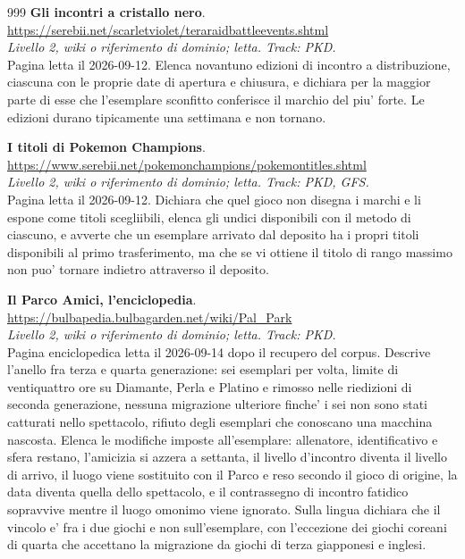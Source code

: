 \begin{thebibliography}{999}
  \textbf{Gli incontri a cristallo nero}.
  \\ \url{https://serebii.net/scarletviolet/teraraidbattleevents.shtml}
  \\ \emph{Livello 2, wiki o riferimento di dominio; letta. Track: PKD.}
  \\ Pagina letta il 2026-09-12. Elenca novantuno edizioni di incontro a distribuzione, ciascuna con le proprie date di apertura e chiusura, e dichiara per la maggior parte di esse che l'esemplare sconfitto conferisce il marchio del piu' forte. Le edizioni durano tipicamente una settimana e non tornano.

  \textbf{I titoli di Pokemon Champions}.
  \\ \url{https://www.serebii.net/pokemonchampions/pokemontitles.shtml}
  \\ \emph{Livello 2, wiki o riferimento di dominio; letta. Track: PKD, GFS.}
  \\ Pagina letta il 2026-09-12. Dichiara che quel gioco non disegna i marchi e li espone come titoli scegliibili, elenca gli undici disponibili con il metodo di ciascuno, e avverte che un esemplare arrivato dal deposito ha i propri titoli disponibili al primo trasferimento, ma che se vi ottiene il titolo di rango massimo non puo' tornare indietro attraverso il deposito.

  \textbf{Il Parco Amici, l'enciclopedia}.
  \\ \url{https://bulbapedia.bulbagarden.net/wiki/Pal_Park}
  \\ \emph{Livello 2, wiki o riferimento di dominio; letta. Track: PKD.}
  \\ Pagina enciclopedica letta il 2026-09-14 dopo il recupero del corpus. Descrive l'anello fra terza e quarta generazione: sei esemplari per volta, limite di ventiquattro ore su Diamante, Perla e Platino e rimosso nelle riedizioni di seconda generazione, nessuna migrazione ulteriore finche' i sei non sono stati catturati nello spettacolo, rifiuto degli esemplari che conoscano una macchina nascosta. Elenca le modifiche imposte all'esemplare: allenatore, identificativo e sfera restano, l'amicizia si azzera a settanta, il livello d'incontro diventa il livello di arrivo, il luogo viene sostituito con il Parco e reso secondo il gioco di origine, la data diventa quella dello spettacolo, e il contrassegno di incontro fatidico sopravvive mentre il luogo omonimo viene ignorato. Sulla lingua dichiara che il vincolo e' fra i due giochi e non sull'esemplare, con l'eccezione dei giochi coreani di quarta che accettano la migrazione da giochi di terza giapponesi e inglesi.


\end{thebibliography}
